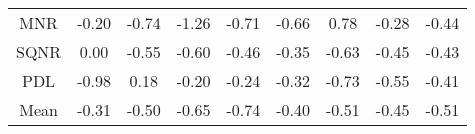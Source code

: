 \documentclass[11pt,a4paper]{report}
\begin{document}
\begin{longtable}{ | c || c | c | c | c | c | c | c || c |}
MNR &  \cellcolor[HTML]{FFF7F7} -0.20 &  \cellcolor[HTML]{FFEFEF} -0.74 &  \cellcolor[HTML]{FFDFDF} -1.26 &  \cellcolor[HTML]{FFEFEF} -0.71 &  \cellcolor[HTML]{FFEFEF} -0.66 &  \cellcolor[HTML]{EFEFFF} 0.78 &  \cellcolor[HTML]{FFF7F7} -0.28 &  \cellcolor[HTML]{FFF7F7} -0.44 \\
SQNR &  \cellcolor[HTML]{FFFFFF} 0.00 &  \cellcolor[HTML]{FFEFEF} -0.55 &  \cellcolor[HTML]{FFEFEF} -0.60 &  \cellcolor[HTML]{FFF7F7} -0.46 &  \cellcolor[HTML]{FFF7F7} -0.35 &  \cellcolor[HTML]{FFEFEF} -0.63 &  \cellcolor[HTML]{FFF7F7} -0.45 &  \cellcolor[HTML]{FFF7F7} -0.43 \\
PDL &  \cellcolor[HTML]{FFE7E7} -0.98 &  \cellcolor[HTML]{F7F7FF} 0.18 &  \cellcolor[HTML]{FFF7F7} -0.20 &  \cellcolor[HTML]{FFF7F7} -0.24 &  \cellcolor[HTML]{FFF7F7} -0.32 &  \cellcolor[HTML]{FFEFEF} -0.73 &  \cellcolor[HTML]{FFEFEF} -0.55 &  \cellcolor[HTML]{FFF7F7} -0.41 \\
\hline
\hline
Mean  &  \cellcolor[HTML]{FFF7F7} -0.31 &  \cellcolor[HTML]{FFEFEF} -0.50 &  \cellcolor[HTML]{FFEFEF} -0.65 &  \cellcolor[HTML]{FFEFEF} -0.74 &  \cellcolor[HTML]{FFF7F7} -0.40 &  \cellcolor[HTML]{FFEFEF} -0.51 &  \cellcolor[HTML]{FFF7F7} -0.45 &  \cellcolor[HTML]{FFEFEF} -0.51 \\
\hline
\end{longtable}
\end{document}
